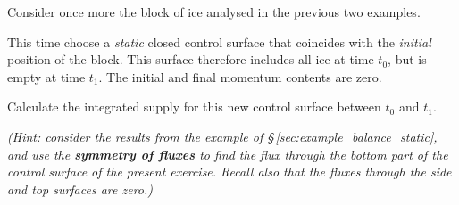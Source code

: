 \documentclass[a4paper,12pt,%
onecolumn,oneside,%
british%
]{memoir}
\renewcommand*{\|}[1][]{\nonscript\:#1\vert\nonscript\:\mathopen{}}
\newcommand*{\sect}{\S}%
\newcommand*{\yti}{t_{0}}
\newcommand*{\ytf}{t_{1}}
\begin{document}
\smallskip

\begin{exercise}
  Consider once more the block of ice analysed in the previous two examples.

  This time choose a \emph{static} closed control surface that coincides with the \emph{initial} position of the block. This surface therefore includes all ice at time $\yti$, but is empty at time $\ytf$. The initial and final momentum contents are zero.

  Calculate the integrated supply for this new control surface between $\yti$ and $\ytf$.

  \emph{(Hint: consider the results from the example of \sect\,\ref{sec:example_balance_static}, and use the \textbf{symmetry of fluxes} to find the flux through the bottom part of the control surface of the present exercise. Recall also that the fluxes through the side and top surfaces are zero.)}
\end{exercise}

\bigskip
\end{document}
